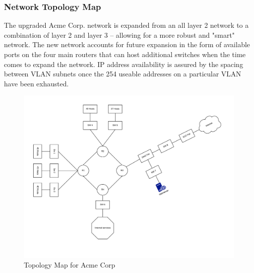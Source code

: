 \subsubsection{Network Topology Map}
The upgraded Acme Corp. network is expanded from an all layer 2 network to a 
combination of layer 2 and layer 3 -- allowing for a more robust and "smart" 
network. The new network accounts for future expansion in the form of 
available ports on the four main routers that can host additional switches when
the time comes to expand the network. IP address availability is assured by
the spacing between VLAN subnets once the 254 useable addresses on a particular 
VLAN have been exhausted.
 
\begin{figure}[!htb]
	\includegraphics[width=7in, scale=0.85]{images/networktopology.png}
	\caption{Topology Map for Acme Corp}
\end{figure}
